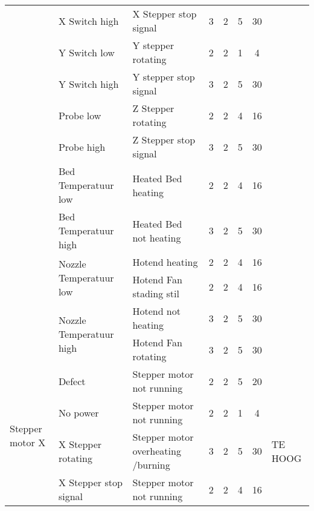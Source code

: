 \begin{landscape}
\begin{longtable}{|l|l|l|c|c|c|c|l|}
                                            & X Switch high             & X Stepper stop signal     & 3 & 2 & 5 & 30 & \\
                                            & Y Switch low              & Y stepper rotating        & 2 & 2 & 1 &  4 & \\
                                            & Y Switch high             & Y stepper stop signal     & 3 & 2 & 5 & 30 & \\
                                            & Probe low                 & Z Stepper rotating        & 2 & 2 & 4 & 16 & \\
                                            & Probe high                & Z Stepper stop signal     & 3 & 2 & 5 & 30 & \\
                                            & Bed Temperatuur low       & Heated Bed heating        & 2 & 2 & 4 & 16 & \\
                                            & Bed Temperatuur high      & Heated Bed not heating    & 3 & 2 & 5 & 30 & \\
                                            & \multirow{2}{*}{Nozzle Temperatuur low}    & Hotend heating            & 2 & 2 & 4 & 16 & \\
                                            &                                            & Hotend Fan stading stil   & 2 & 2 & 4 & 16 & \\
                                            & \multirow{2}{*}{Nozzle Temperatuur high}   & Hotend not heating        & 3 & 2 & 5 & 30 & \\
                                            &                                            & Hotend Fan rotating       & 3 & 2 & 5 & 30 & \\
                                            \hline
        \multirow{4}{*}{Stepper motor X}    & Defect                & Stepper motor not running             & 2 & 2 & 5 & 20 & \\
                                            & No power              & Stepper motor not running             & 2 & 2 & 1 &  4 & \\
                                            & X Stepper rotating    & Stepper motor overheating /burning    & 3 & 2 & 5 & 30 & TE HOOG \\
                                            & X Stepper stop signal & Stepper motor not running             & 2 & 2 & 4 & 16 & \\ 
                                            \hline 

\end{longtable}
\end{landscape}
